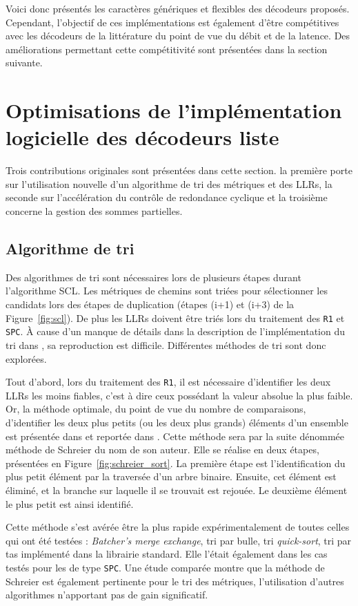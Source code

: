 Voici donc présentés les caractères génériques et flexibles des décodeurs proposés. Cependant, l'objectif de ces implémentations est également d'être compétitives avec les décodeurs de la littérature du point de vue du débit et de la latence. Des améliorations permettant cette compétitivité sont présentées dans la section suivante.

\section{Optimisations de l'implémentation logicielle des décodeurs liste}
\label{sec:opti_scl}
Trois contributions originales sont présentées dans cette section. la première porte sur l'utilisation nouvelle d'un algorithme de tri des métriques et des LLRs, la seconde sur l'accélération du contrôle de redondance cyclique et la troisième concerne la gestion des sommes partielles. 

\subsection{Algorithme de tri}
Des algorithmes de tri sont nécessaires lors de plusieurs étapes durant l'algorithme SCL. Les métriques de chemins sont triées pour sélectionner les candidats lors des étapes de duplication (étapes (i+1) et (i+3) de la Figure~\ref{fig:scl}). De plus les LLRs doivent être triés lors du traitement des \noeuds \texttt{R1} et \texttt{SPC}. \`A cause d'un manque de détails dans la description de l'implémentation du tri dans \cite{sarkis_fast_2016}, sa reproduction est difficile. Différentes méthodes de tri sont donc explorées.

Tout d'abord, lors du traitement des \noeuds \texttt{R1}, il est nécessaire d'identifier les deux LLRs les moins fiables, c'est à dire ceux possédant la valeur absolue la plus faible. Or, la méthode optimale, du point de vue du nombre de comparaisons, d'identifier les deux plus petits (ou les deux plus grands) éléments d'un ensemble est présentée dans \cite{schreier_tournament_1932} et reportée dans \cite{knuth_art_1973}. Cette méthode sera par la suite dénommée méthode de Schreier du nom de son auteur. Elle se réalise en deux étapes, présentées en Figure~\ref{fig:schreier_sort}. La première étape est l'identification du plus petit élément par la traversée d'un arbre binaire. Ensuite, cet élément est éliminé, et la branche sur laquelle il se trouvait est rejouée. Le deuxième élément le plus petit est ainsi identifié.

Cette méthode s'est avérée être la plus rapide expérimentalement de toutes celles qui ont été testées : \textit{Batcher's merge exchange}, tri par bulle, tri \textit{quick-sort}, tri par tas implémenté dans la librairie standard. Elle l'était également dans les cas testés pour les \noeuds de type \texttt{SPC}. Une étude comparée montre que la méthode de Schreier est également pertinente pour le tri des métriques, l'utilisation d'autres algorithmes n'apportant pas de gain significatif.

